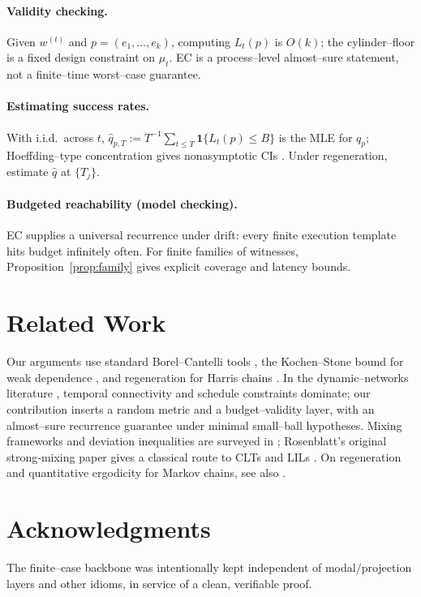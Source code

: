 \documentclass[11pt]{article}
\theoremstyle{plain}
\theoremstyle{definition}
\begin{document}
\paragraph{Validity checking.}
Given $w^{(t)}$ and $p=(e_1,\dots,e_k)$, computing $L_t(p)$ is $O(k)$; the cylinder–floor is a fixed design constraint on $\mu_t$. EC is a process–level almost–sure statement, not a finite–time worst–case guarantee.

\paragraph{Estimating success rates.}
With i.i.d.\ across $t$, $\hat q_{p,T}:=T^{-1}\sum_{t\le T}\mathbf{1}\{L_t(p)\le B\}$ is the MLE for $q_p$; Hoeffding–type concentration gives nonasymptotic CIs \cite{Hoeffding}. Under regeneration, estimate $\hat q$ at $\{T_j\}$.

\paragraph{Budgeted reachability (model checking).}
EC supplies a universal recurrence under drift: every finite execution template hits budget infinitely often. For finite families of witnesses, Proposition~\ref{prop:family} gives explicit coverage and latency bounds.

\section{Related Work}
Our arguments use standard Borel–Cantelli tools \cite[§2.3]{Billingsley,Durrett}, the Kochen–Stone bound for weak dependence \cite{KochenStone}, and regeneration for Harris chains \cite{MeynTweedie}. In the dynamic–networks literature \cite{TVGSurvey}, temporal connectivity and schedule constraints dominate; our contribution inserts a random metric and a budget–validity layer, with an almost–sure recurrence guarantee under minimal small–ball hypotheses. Mixing frameworks and deviation inequalities are surveyed in \cite{Doukhan1994,Bradley2005}; Rosenblatt’s original strong‑mixing paper gives a classical route to CLTs and LILs \cite{Rosenblatt1956}. On regeneration and quantitative ergodicity for Markov chains, see also \cite{Nummelin1984,Asmussen2003,Dobrushin1956}.

\section*{Acknowledgments}
The finite–case backbone was intentionally kept independent of modal/projection layers and other idioms, in service of a clean, verifiable proof.



\end{document}
